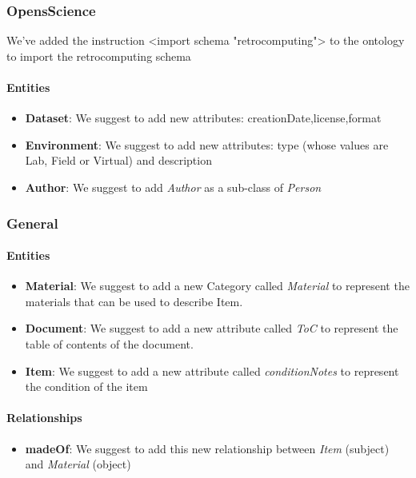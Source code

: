\subsubsection{OpensScience}

We've added the instruction <import schema "retrocomputing"> to the ontology to import the retrocomputing schema

\paragraph{Entities}
\begin{itemize}
    \item \textbf{Dataset}: We suggest to add new attributes: creationDate,license,format
    \item \textbf{Environment}: We suggest to add new attributes: type (whose values are Lab, Field or Virtual) and description
    \item \textbf{Author}: We suggest to add \textit{Author} as a sub-class of \textit{Person}
\end{itemize}

\subsubsection{General}
\paragraph{Entities}
\begin{itemize}
    \item \textbf{Material}: We suggest to add a new Category called \textit{Material} to represent the materials that can be used to describe Item.
    \item \textbf{Document}: We suggest to add a new attribute called \textit{ToC} to represent the table of contents of the document.
    \item \textbf{Item}: We suggest to add a new attribute called \textit{conditionNotes} to represent the condition of the item
\end{itemize}
\paragraph{Relationships}
\begin{itemize}
    \item \textbf{madeOf}: We suggest to add this new relationship between \textit{Item} (subject) and \textit{Material} (object)
\end{itemize}

